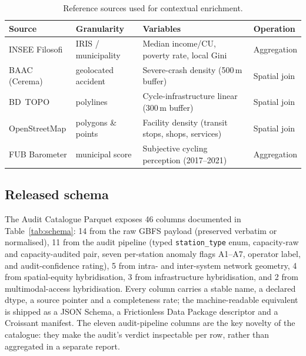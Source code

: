 \documentclass[11pt,a4paper]{article}
\begin{document}
\begin{table}[ht]
\centering
\caption{Reference sources used for contextual enrichment.}
\label{tab:sources}
\small
\begin{tabular}{@{}llll@{}}
\toprule
\textbf{Source} & \textbf{Granularity} & \textbf{Variables} &
\textbf{Operation}\\
\midrule
INSEE Filosofi & IRIS / municipality &
   Median income/CU, poverty rate, local Gini & Aggregation \\
BAAC (Cerema)  & geolocated accident &
   Severe-crash density (500\,m buffer) & Spatial join \\
BD~TOPO        & polylines &
   Cycle-infrastructure linear (300\,m buffer) & Spatial join \\
OpenStreetMap  & polygons \& points &
   Facility density (transit stops, shops, services) & Spatial join \\
FUB Barometer  & municipal score &
   Subjective cycling perception (2017--2021) & Aggregation \\
\bottomrule
\end{tabular}
\end{table}

\subsection{Released schema}
The Audit Catalogue Parquet exposes 46 columns documented in
Table~\ref{tab:schema}: 14 from the raw GBFS payload (preserved
verbatim or normalised), 11 from the audit pipeline (typed
\texttt{station\_type} enum, capacity-raw and capacity-audited
pair, seven per-station anomaly flags A1--A7, operator label, and
audit-confidence rating), 5 from intra- and inter-system network
geometry, 4 from spatial-equity hybridisation, 3 from infrastructure
hybridisation, and 2 from multimodal-access hybridisation. Every
column carries a stable name, a declared dtype, a source pointer
and a completeness rate; the machine-readable equivalent is shipped
as a JSON Schema, a Frictionless Data Package descriptor and a
Croissant manifest. The eleven audit-pipeline columns are the
key novelty of the catalogue: they make the audit's verdict
inspectable per row, rather than aggregated in a separate report.
\end{document}
